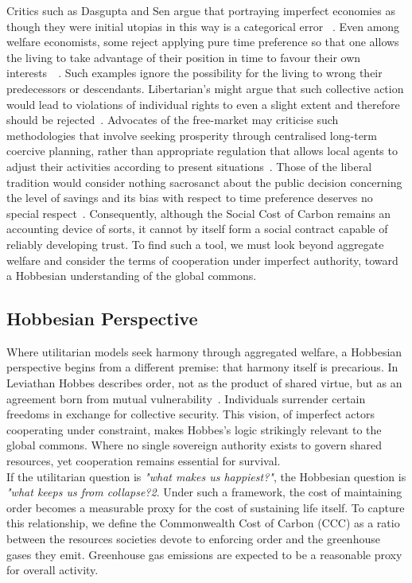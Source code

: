 \documentclass[12pt, oneside]{article}   	%
\begin{document}
Critics such as Dasgupta and Sen argue that portraying imperfect economies as though they were initial utopias in this way is a categorical error ~\cite{as1}.
Even among welfare economists, some reject applying pure time preference so that one allows the living to take advantage of their position in time to favour their own interests~\cite{hs1}~\cite{fr1}.
Such examples ignore the possibility for the living to wrong their predecessors or descendants.
Libertarian's might argue that such collective action would lead to violations of individual rights to even a slight extent and therefore should be rejected~\cite{rn1}.
Advocates of the free-market may criticise such methodologies that involve seeking prosperity through centralised long-term coercive planning, rather than appropriate regulation that allows local agents to adjust their activities according to present situations~\cite{fh1}.
Those of the liberal tradition would consider nothing sacrosanct about the public decision concerning the level of savings and its bias with respect to time preference deserves no special respect~\cite{jr1}.
Consequently, although the Social Cost of Carbon remains an accounting device of sorts, it cannot by itself form a social contract capable of reliably developing trust.
To find such a tool, we must look beyond aggregate welfare and consider the terms of cooperation under imperfect authority, toward a Hobbesian understanding of the global commons.\\

\subsection{Hobbesian Perspective}

Where utilitarian models seek harmony through aggregated welfare, a Hobbesian perspective begins from a different premise: that harmony itself is precarious.
In Leviathan Hobbes describes order, not as the product of shared virtue, but as an agreement born from mutual vulnerability~\cite{th1}.
Individuals surrender certain freedoms in exchange for collective security.
This vision, of imperfect actors cooperating under constraint, makes Hobbes’s logic strikingly relevant to the global commons.
Where no single sovereign authority exists to govern shared resources, yet cooperation remains essential for survival.\\

If the utilitarian question is \emph{"what makes us happiest?"}, the Hobbesian question is \emph{"what keeps us from collapse?2}.
Under such a framework, the cost of maintaining order becomes a measurable proxy for the cost of sustaining life itself.
To capture this relationship, we define the Commonwealth Cost of Carbon (CCC) as a ratio between the resources societies devote to enforcing order and the greenhouse gases they emit.
Greenhouse gas emissions are expected to be a reasonable proxy for overall activity.\\
\end{document}
